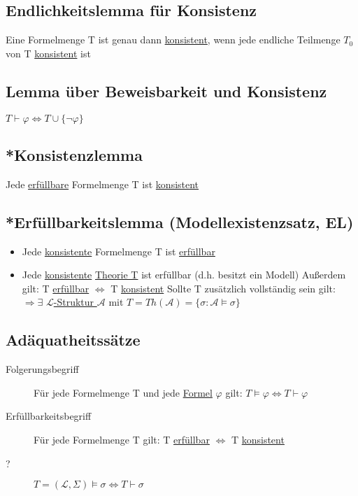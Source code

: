 \documentclass[12pt,a4paper]{article} %
\begin{document}
	\subsection{Endlichkeitslemma für Konsistenz}
	Eine Formelmenge T ist genau dann \hyperref[ALKonsistent]{konsistent}, wenn jede endliche Teilmenge $T_0$ von T \hyperref[ALKonsistent]{konsistent} ist
	
	\subsection{Lemma über Beweisbarkeit und Konsistenz}
	$T \hyperref[Beweisbar]{\vdash} \varphi \Leftrightarrow T \cup \{\neg \varphi\}$
	
	\subsection{*Konsistenzlemma}
	Jede \hyperref[Erfullbar]{erfüllbare} Formelmenge T ist \hyperref[ALKonsistent]{konsistent}

	\subsection{*Erfüllbarkeitslemma (Modellexistenzsatz, EL)}
	\begin{itemize}
		\item Jede \hyperref[ALKonsistent]{konsistente} Formelmenge T ist \hyperref[Erfullbar]{erfüllbar}
		\item Jede \hyperref[PLKonsistent]{konsistente} \hyperref[Theorie]{Theorie T} ist erfüllbar (d.h. besitzt ein Modell) \newline
		Außerdem gilt: T \hyperref[Erfullbar]{erfüllbar} $\Leftrightarrow$ T \hyperref[PLKonsistent]{konsistent} \newline
		Sollte T zusätzlich vollständig sein gilt: $\Rightarrow \exists$ \hyperref[Struktur]{$\mathcal{L}$-Struktur $\mathcal{A}$} mit $T = Th(\mathcal{A}) = \{\sigma : \mathcal{A} \hyperref[Erfullbar]{\vDash} \sigma\}$
	\end{itemize}
	
	\subsection{Adäquatheitssätze}
	\begin{description}
		\item[Folgerungsbegriff] Für jede Formelmenge T und jede \hyperref[Formel]{Formel} $\varphi$ gilt: $T \hyperref[Erfullbar]{\vDash} \varphi \Leftrightarrow T \hyperref[Beweisbar]{\vdash} \varphi$
		\item[Erfüllbarkeitsbegriff] Für jede Formelmenge T gilt: T \hyperref[Erfullbar]{erfüllbar} $\Leftrightarrow$ T \hyperref[ALKonsistent]{konsistent}
		\item[?] $T = (\mathcal{L}, \Sigma) \hyperref[Erfullbar]{\vDash} \sigma \Leftrightarrow T \hyperref[Beweisbar]{\vdash} \sigma$
	\end{description} 
	
\end{document}
